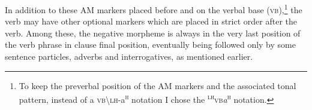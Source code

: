\documentclass[output=paper,colorlinks=true, citecolor=brown]{langscibook}
\begin{document}


    
In addition to these AM markers placed before and on the verbal base (\textsc{vb}),\footnote{To keep the preverbal position of the AM markers and the associated tonal pattern, instead of a \textsc{vb}{\textbackslash}\textsc{lh}{}-a\textsuperscript{\textsc{h}} notation I chose the \textsuperscript{\textsc{lh}}\textsc{vb}\textit{a}\textsuperscript{\textsc{h}} notation.} the verb may have other optional markers which are placed in strict order after the verb. Among these, the negative morpheme is always in the very last position of the verb phrase in clause final position, eventually being followed only by some sentence particles, adverbs and interrogatives, as mentioned earlier.
\end{document}

